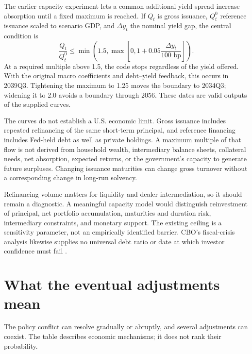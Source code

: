 \documentclass[11pt]{article}
\begin{document}
The earlier capacity experiment lets a common additional yield spread increase absorption
until a fixed maximum is reached. If $Q_t$ is gross issuance, $Q_t^0$ reference issuance
scaled to scenario GDP, and $\Delta y_t$ the nominal yield gap, the central condition is
\[
\frac{Q_t}{Q_t^0}\le
\min\left(1.5,\max\left[0,1+0.05\frac{\Delta y_t}{100\text{ bp}}\right]\right).
\]
At a required multiple above 1.5, the code stops regardless of the yield offered. With the
original macro coefficients and debt--yield feedback, this occurs in 2039Q3. Tightening
the maximum to 1.25 moves the boundary to 2034Q3; widening it to 2.0 avoids a boundary
through 2056. These dates are valid outputs of the supplied curves.

The curves do not establish a U.S. economic limit. Gross issuance includes repeated
refinancing of the same short-term principal, and reference financing includes Fed-held
debt as well as private holdings. A maximum multiple of that flow is not derived from
household wealth, intermediary balance sheets, collateral needs, net absorption, expected
returns, or the government's capacity to generate future surpluses. Changing issuance
maturities can change gross turnover without a corresponding change in long-run solvency.

Refinancing volume matters for liquidity and dealer intermediation, so it should remain
a diagnostic. A meaningful capacity model would distinguish reinvestment of principal,
net portfolio accumulation, maturities and duration risk, intermediary constraints, and
monetary support. The existing ceiling is a sensitivity parameter, not an empirically
identified barrier. CBO's fiscal-crisis analysis likewise supplies no universal debt ratio
or date at which investor confidence must fail \cite{cboCrisis}.

\section{What the eventual adjustments mean}

The policy conflict can resolve gradually or abruptly, and several adjustments can coexist.
The table describes economic mechanisms; it does not rank their probability.
\end{document}
